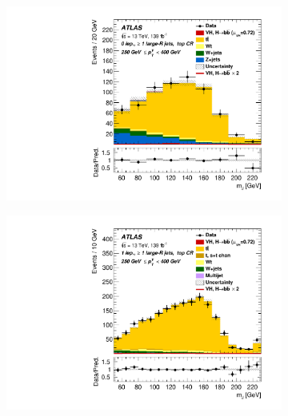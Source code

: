 \begin{figure}[!htbp]
  \centering
  \begin{subfigure}{.4\textwidth}
    \includegraphics[width=\textwidth]{chapters/6.vhbb_boosted/figs/Region_distmBB_J0_L0_T2_DSRtopaddbjetcr_Y6051_incJet1_Fat1_incFat1_BMin250_BMax400_GlobalFit_unconditionnal_mu1.pdf}
  \end{subfigure}%
  \begin{subfigure}{.4\textwidth}
    \includegraphics[width=\textwidth]{chapters/6.vhbb_boosted/figs/Region_distmBB_J0_L1_T2_DSRtopaddbjetcr_Y6051_incJet1_Fat1_incFat1_BMin250_BMax400_GlobalFit_unconditionnal_mu1.pdf}
  \end{subfigure}
  \begin{subfigure}{.4\textwidth}

\end{subfigure}
\end{figure}
